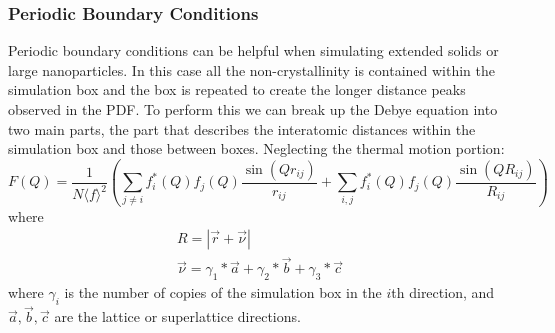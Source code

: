 \subsubsection{Periodic Boundary Conditions}
Periodic boundary conditions can be helpful when simulating extended solids or large nanoparticles. In this case all the non-crystallinity is contained within the simulation box and the box is repeated to create the longer distance peaks observed in the PDF. To perform this we can break up the Debye equation into two main parts, the part that describes the interatomic distances within the simulation box and those between boxes. Neglecting the thermal motion portion:
\begin{equation}
  F(Q) = \frac{1}{N \langle f \rangle^{2}}(\sum_{j\neq i} f_i^{*}(Q)f_j(Q) \frac{\sin(Qr_{ij})}{r_{ij}} + \sum_{i,j} f_i^{*}(Q)f_j(Q) \frac{\sin(QR_{ij})}{R_{ij}})
\end{equation}
where
\begin{eqnarray}
  R = |\vec{r} + \vec{\nu}|\\
  \vec{\nu} = \gamma_1*\vec{a} + \gamma_2*\vec{b} + \gamma_3*\vec{c}
\end{eqnarray}
where $\gamma_{i}$ is the number of copies of the simulation box in the $i$th direction, and $\vec{a}, \vec{b}, \vec{c}$ are the lattice or superlattice directions.

%
